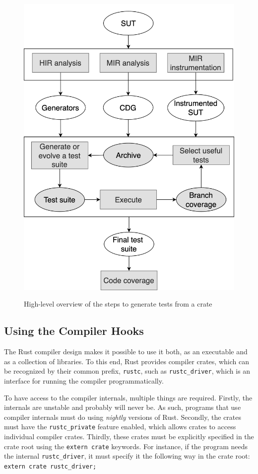 \documentclass{article}
\begin{document}
\begin{figure}[h!]
\caption{High-level overview of the steps to generate tests from a crate}
\centering
\includegraphics[width=\textwidth]{new-overview}
\label{fig:rustyunit-overview}
\end{figure}

\subsection{Using the Compiler Hooks}
The Rust compiler design makes it possible to use it both, as an executable and as a collection of libraries. To this end, Rust provides compiler crates, which can be recognized by their common prefix, \lstinline{rustc}, such as \lstinline{rustc_driver}, which is an interface for running the compiler programmatically.

To have access to the compiler internals, multiple things are required. Firstly, the internals are unstable and probably will never be. As such, programs that use compiler internals must do using \textit{nightly} versions of Rust. Secondly, the crates must have the \lstinline{rustc_private} feature enabled, which allows crates to access individual compiler crates. Thirdly, these crates must be explicitly specified in the crate root using the \lstinline{extern crate} keywords. For instance, if the program needs the internal \lstinline{rustc_driver}, it must specify it the following way in the crate root: \lstinline[basicstyle=\fontfamily{Fira Code}\selectfont]{extern crate rustc_driver;}
\end{document}
